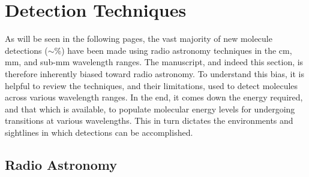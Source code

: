 \documentclass[twocolumn]{aastex631}
\newcommand{\update}[1]{{#1}}
\newcommand{\radiopercent}{}
\begin{document}
	
	
	
	
	
	
	
	
	

\section{Detection Techniques}
\label{detecting}

As will be seen in the following pages, the vast majority of new molecule detections (\update{$\sim$\radiopercent\%}) have been made using radio astronomy techniques in the cm, mm, and sub-mm wavelength ranges.  The manuscript, and indeed this section, is therefore inherently biased toward radio astronomy.  To understand this bias, it is helpful to review the techniques, and their limitations, used to detect molecules across various wavelength ranges.  In the end, it comes down the energy required, and that which is available, to populate molecular energy levels for undergoing transitions at various wavelengths.  This in turn dictates the environments and sightlines in which detections can be accomplished.

\subsection{Radio Astronomy}
\label{detecting:radio}
\end{document}
